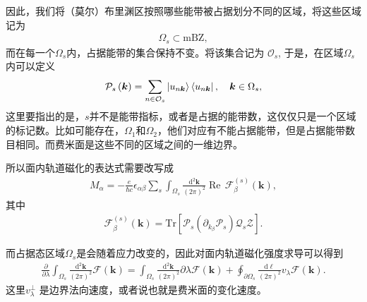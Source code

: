 \documentclass[10pt, oneside]{article}
\begin{document}
因此，我们将（莫尔）布里渊区按照哪些能带被占据划分不同的区域，将这些区域记为
\begin{align}
	\Omega_{s} \subset \mathrm{mBZ},
\end{align}
而在每一个\(\Omega_{s}\)内，占据能带的集合保持不变。将该集合记为 \(\mathcal{O}_{s}\), 于是，在区域\(\Omega_{s}\)内可以定义
\begin{align}
	\mathcal{P}_{s } \left(\bm{k }\right) = \sum_{n \in \mathcal{O}_{s }} \ket{u_{n \bm{k}}} \bra{u_{n \bm{k}}}, \quad \bm{k} \in \Omega_{s},
\end{align}
这里要指出的是，\(s\)并不是能带指标，或者是占据的能带数，这仅仅只是一个区域的标记数。比如可能存在，\(\Omega_{1}\)和\(\Omega_{2}\)，他们对应有不能占据能带，但是占据能带数目相同。而费米面是这些不同的区域之间的一维边界。

所以面内轨道磁化的表达式需要改写成
\begin{align}
	M_{\alpha} = -\frac{e }{\hbar c} \epsilon_{\alpha \beta} \sum_{s } \int_{\Omega_{s }} \frac{\mathrm{d}^{2} \bm{k}}{\left(2 \pi\right)^2} \operatorname{Re} \, \mathcal{F}^{\left(s \right)}_{\beta} \left(\bm{k }\right),
\end{align}
其中
\begin{align}
	\mathcal{F}^{\left(s \right)}_{\beta} \left(\bm{k }\right) = \mathrm{Tr} \left[\mathcal{P}_{s} \left(\partial_{k_{\beta}} \mathcal{P}_{s} \right) \mathcal{Q}_{s } \mathcal{Z} \right].
\end{align}

而占据态区域\(\Omega_{s}\)是会随着应力改变的，因此对面内轨道磁化强度求导可以得到
\begin{align}
	\frac{\partial}{\partial \lambda} \int_{\Omega_{s }} \frac{\mathrm{d}^{2} \bm{k}}{\left(2 \pi\right)^2} \mathcal{F} \left(\bm{k }\right) = \int_{\Omega_{s }} \frac{\mathrm{d}^{2} \bm{k}}{\left(2 \pi\right)^2} \partial \lambda \mathcal{F}  \left(\bm{k }\right) + \oint_{\partial \Omega_{s }} \frac{\mathrm{d} \ell}{\left(2 \pi\right)^{2}} v_{\lambda} \mathcal{F} \left(\bm{k}\right).
\end{align}
这里\(v^{\perp}_{\lambda}\) 是边界法向速度，或者说也就是费米面的变化速度。
\end{document}
